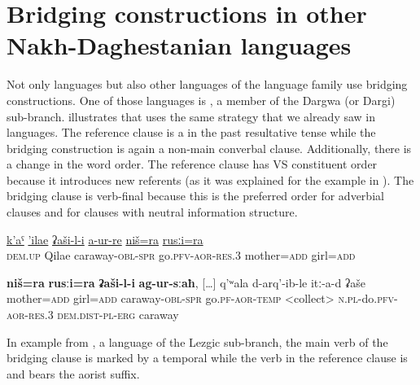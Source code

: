 \documentclass[output=paper]{LSP/langsci}
\begin{document}
\section{Bridging constructions in other Nakh-Daghestanian languages}
\label{sec:Bridging constructions in other Nakh-Daghestanian languages}
Not only  languages but also other languages of the  language family use bridging constructions. One of those languages is , a member of the Dargwa (or Dargi) sub-branch.  illustrates that  uses the same strategy that we already saw in  languages. The reference clause is a  in the past resultative tense while the bridging construction is again a non-main converbal clause. Additionally, there is a change in the word order. The reference clause has VS constituent order because it introduces new referents (as it was explained for the  example in ). The bridging clause is verb-final because this is the preferred order for adverbial clauses and for clauses with neutral information structure.

\begin{exe}
	\ex	\label{ex:27ab}
	\begin{xlist}
		\ex	\label{ex:27a}
		\gll	\underline{k’aˤ}	\underline{’ilae}	\underline{ʡaši-l-i}	\underline{a-ur-re}	\underline{niš=ra} \underline{rusːi=ra}\\
			\textsc{dem.up}	Qilae	caraway-\textsc{obl-spr}	go.\textsc{pfv-aor-res.3}	mother=\textsc{add} girl=\textsc{add}\\
		\glt	{}

		\ex	\label{ex:27b}
		\gll	\textbf{niš=ra}	\textbf{rusːi=ra}	\textbf{ʡaši-l-i}	\textbf{ag-ur-sːaħ},	[…] q’ʷala	d-arq’-ib-le	itː-a-d	ʡaše \\
			mother=\textsc{add}	girl=\textsc{add}	 caraway-\textsc{obl-spr} 	go.\textsc{pf-aor-temp} \phantom{x} <collect>	\textsc{n.pl}-do.\textsc{pfv-aor-res.3}	\textsc{dem.dist-pl-erg}	caraway\\
		\glt	{} 
	\end{xlist}
\end{exe}

In example  from , a language of the Lezgic sub-branch, the main verb of the bridging clause is marked by a temporal  while the verb in the reference clause is  and bears the aorist suffix. 
\end{document}
